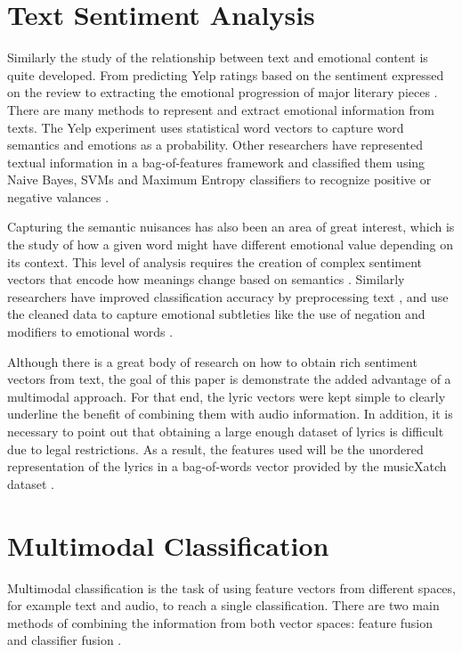 \section*{Text Sentiment Analysis}

Similarly the study of the relationship between text and emotional content is quite 
developed. From predicting Yelp ratings based on the sentiment expressed on the 
review \cite{YelpReview}  to extracting the emotional progression of major literary pieces \cite{transprose}.  
There are many methods to represent and extract emotional information from texts. 
The Yelp experiment uses statistical word vectors to capture word semantics and 
emotions as a probability.  Other researchers have represented textual information in 
a bag-of-features framework and classified them using Naive Bayes, SVMs and 
Maximum Entropy classifiers to recognize positive or negative valances \cite{Pang:2002:TUS:1118693.1118704}.  

Capturing the semantic nuisances has also been an area of great interest, which is 
the study of how a given word might have different emotional value depending on its 
context. This level of analysis requires the creation of complex sentiment vectors 
that encode how meanings change based on semantics \cite{Maas:2011:LWV:2002472.2002491}.  Similarly researchers 
have improved classification accuracy by preprocessing text \cite{Haddi201326}, and use the 
cleaned data to capture emotional subtleties like the use of negation and modifiers 
to emotional words \cite{Xia_sentimentvector}. 

Although there is a great body of research on how to obtain rich sentiment vectors 
from text, the goal of this paper is demonstrate the added advantage of a 
multimodal approach.  For that end, the lyric vectors were kept simple to clearly
underline the benefit of combining them with audio information.  In addition, it is necessary 
to point out that obtaining a large enough dataset of lyrics is difficult due to legal restrictions.   
As a result, the features used will be the unordered representation of the lyrics in 
a bag-of-words vector provided by the musicXatch dataset \cite{musicXmatchDataset}.

\section*{Multimodal Classification}

Multimodal classification is the task of using feature vectors from different spaces, 
for example text and audio, to reach a single classification. There are two main 
methods of combining the information from both vector spaces: feature fusion and 
classifier fusion \cite{zhonga2012music}. 

